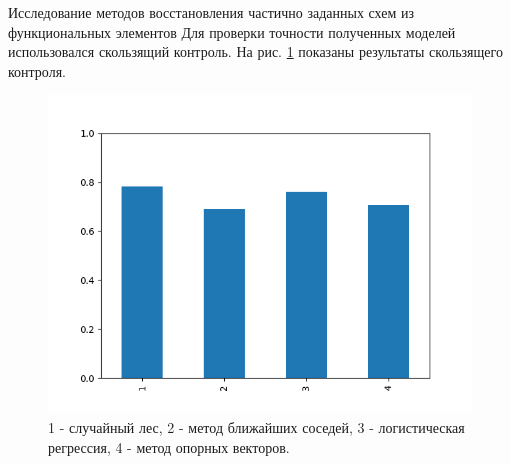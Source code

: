 \documentclass[serif,utf8]{beamer}
\begin{document}
\begin{frame}{Исследование методов восстановления частично заданных схем из функциональных элементов}
Для проверки точности полученных моделей использовался скользящий контроль.
На рис. \ref{picCV} показаны результаты скользящего контроля.\par
\begin{figure}[h!]
   \centering
   \includegraphics[width=0.7\linewidth]{cross_validation.png}
   \caption{\scriptsize{1 - случайный лес, 2 - метод ближайших соседей, 3 - логистическая регрессия, 4 - метод опорных векторов.}}
   \label{picCV}
\end{figure}
\end{frame}
\end{document}
